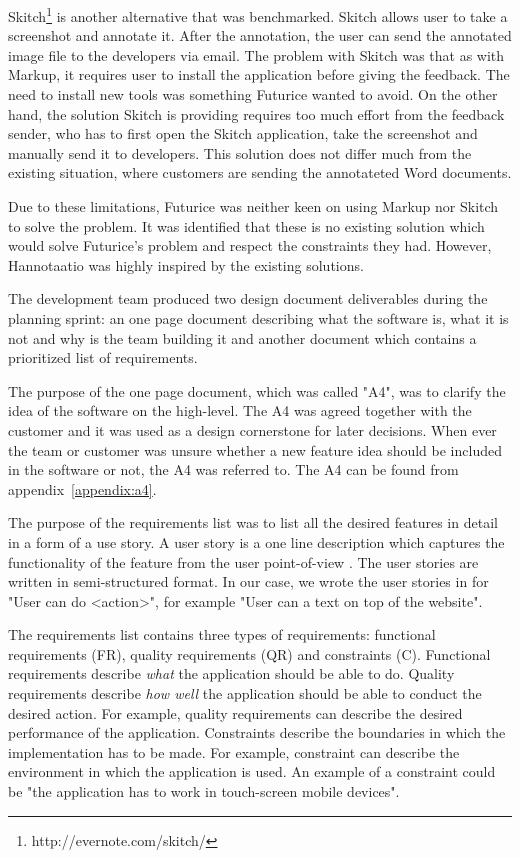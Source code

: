 \documentclass[english,12pt,a4paper,pdftex]{article}
\begin{document}
Skitch\footnote{http://evernote.com/skitch/} is another alternative that was benchmarked. Skitch allows user to take a screenshot and annotate it. After the annotation, the user can send the annotated image file to the developers via email. The problem with Skitch was that as with Markup, it requires user to install the application before giving the feedback. The need to install new tools was something Futurice wanted to avoid. On the other hand, the solution Skitch is providing requires too much effort from the feedback sender, who has to first open the Skitch application, take the screenshot and manually send it to developers. This solution does not differ much from the existing situation, where customers are sending the annotateted Word documents.

Due to these limitations, Futurice was neither keen on using Markup nor Skitch to solve the problem. It was identified that these is no existing solution which would solve Futurice's problem and respect the constraints they had. However, Hannotaatio was highly inspired by the existing solutions.

The development team produced two design document deliverables during the planning sprint: an one page document describing what the software is, what it is not and why is the team building it and another document which contains a prioritized list of requirements.

The purpose of the one page document, which was called "A4", was to clarify the idea of the software on the high-level. The A4 was agreed together with the customer and it was used as a design cornerstone for later decisions. When ever the team or customer was unsure whether a new feature idea should be included in the software or not, the A4 was referred to. The A4 can be found from appendix~\ref{appendix:a4}.

The purpose of the requirements list was to list all the desired features in detail in a form of a use story. A user story is a one line description which captures the functionality of the feature from the user point-of-view \citep{userstory}. The user stories are written in semi-structured format. In our case, we wrote the user stories in for "User can do <action>", for example "User can a text on top of the website".

The requirements list contains three types of requirements: functional requirements (FR), quality requirements (QR) and constraints (C). Functional requirements describe \emph{what} the application should be able to do. Quality requirements describe \emph{how well} the application should be able to conduct the desired action. For example, quality requirements can describe the desired performance of the application. Constraints describe the boundaries in which the implementation has to be made. For example, constraint can describe the environment in which the application is used. An example of a constraint could be "the application has to work in touch-screen mobile devices".
\end{document}
